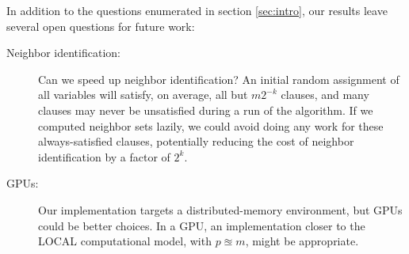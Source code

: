 \documentclass[twocolumn]{article}
\begin{document}
In addition to the questions enumerated in section \ref{sec:intro}, our results leave several open questions for future work:
\begin{description}
  \item[Neighbor identification:] Can we speed up neighbor identification?  An initial random assignment of all variables will satisfy, on average, all but $m 2^{-k}$ clauses, and many clauses may never be unsatisfied during a run of the algorithm.  If we computed neighbor sets lazily, we could avoid doing any work for these always-satisfied clauses, potentially reducing the cost of neighbor identification by a factor of $2^k$.
  \item[GPUs:] Our implementation targets a distributed-memory environment, but GPUs could be better choices.  In a GPU, an implementation closer to the LOCAL computational model, with $p \approxeq m$, might be appropriate.
\end{description}



\end{document}
